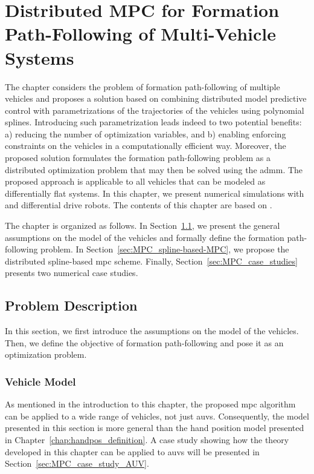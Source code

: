 \chapter{Distributed MPC for Formation Path-Following of Multi-Vehicle Systems}
\label{chap:handpos_MPC}


The chapter considers the problem of formation path-following of multiple vehicles and proposes a solution based on combining distributed model predictive control with parametrizations of the trajectories of the vehicles using polynomial splines. Introducing such parametrization leads indeed to two potential benefits: a) reducing the number of optimization variables, and b) enabling enforcing constraints on the vehicles in a computationally efficient way. Moreover, the proposed solution formulates the formation path-following problem as a distributed optimization problem that may then be solved using the \gls{admm}.
The proposed approach is applicable to all vehicles that can be modeled as differentially flat systems.
In this chapter, we present numerical simulations with  and differential drive robots.
The contents of this chapter are based on \cite{matous_MPC_2022}.

The chapter is organized as follows.
In Section~\ref{sec:MPC_problem-description}, we present the general assumptions on the model of the vehicles and formally define the formation path-following problem.
In Section~\ref{sec:MPC_spline-based-MPC}, we propose the distributed spline-based \gls{mpc} scheme.
Finally, Section~\ref{sec:MPC_case_studies} presents two numerical case studies.

\section{Problem Description}
\label{sec:MPC_problem-description}

In this section, we first introduce the assumptions on the model of the vehicles.
Then, we define the objective of formation path-following and pose it as an optimization problem.



\subsection{Vehicle Model}
\label{ssec:MPC_vehicle-model}

As mentioned in the introduction to this chapter, the proposed \gls{mpc} algorithm can be applied to a wide range of vehicles, not just \glspl{auv}.
Consequently, the model presented in this section is more general than the hand position model presented in Chapter~\ref{chap:handpos_definition}.
A case study showing how the theory developed in this chapter can be applied to \glspl{auv} will be presented in Section~\ref{sec:MPC_case_study_AUV}.

